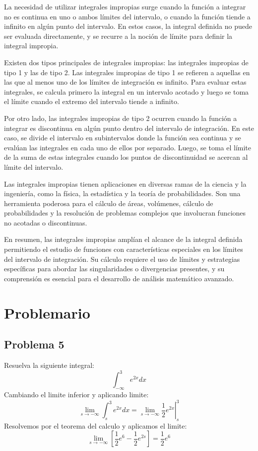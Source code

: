 \documentclass{article}
\begin{document}
La necesidad de utilizar integrales impropias surge cuando la función a integrar no es continua en uno o ambos límites del intervalo, o cuando la función tiende a infinito en algún punto del intervalo. En estos casos, la integral definida no puede ser evaluada directamente, y se recurre a la noción de límite para definir la integral impropia.

Existen dos tipos principales de integrales impropias: las integrales impropias de tipo 1 y las de tipo 2. Las integrales impropias de tipo 1 se refieren a aquellas en las que al menos uno de los límites de integración es infinito. Para evaluar estas integrales, se calcula primero la integral en un intervalo acotado y luego se toma el límite cuando el extremo del intervalo tiende a infinito.

Por otro lado, las integrales impropias de tipo 2 ocurren cuando la función a integrar es discontinua en algún punto dentro del intervalo de integración. En este caso, se divide el intervalo en subintervalos donde la función sea continua y se evalúan las integrales en cada uno de ellos por separado. Luego, se toma el límite de la suma de estas integrales cuando los puntos de discontinuidad se acercan al límite del intervalo.

Las integrales impropias tienen aplicaciones en diversas ramas de la ciencia y la ingeniería, como la física, la estadística y la teoría de probabilidades. Son una herramienta poderosa para el cálculo de áreas, volúmenes, cálculo de probabilidades y la resolución de problemas complejos que involucran funciones no acotadas o discontinuas.

En resumen, las integrales impropias amplían el alcance de la integral definida permitiendo el estudio de funciones con características especiales en los límites del intervalo de integración. Su cálculo requiere el uso de límites y estrategias específicas para abordar las singularidades o divergencias presentes, y su comprensión es esencial para el desarrollo de análisis matemático avanzado.

\section{Problemario}
\subsection{Problema 5}
Resuelva la siguiente integral:
\begin{equation}
    \int_{-\infty}^{3}e^{2x}dx
\end{equation}
Cambiando el limite inferior y aplicando limite:
\begin{equation}
    \lim_{s\to -\infty} \int_{s}^{3}e^{2x}dx = \lim_{s\to -\infty} \left.\frac{1}{2}e^{2x}\right|_{s}^{3}
\end{equation}
Resolvemos por el teorema del calculo y aplicamos el limite:
\begin{equation}
    \lim_{s\to -\infty}\left[\frac{1}{2}e^6-\frac{1}{2}e^{2s}\right] = \frac{1}{2}e^6
\end{equation}
\end{document}
